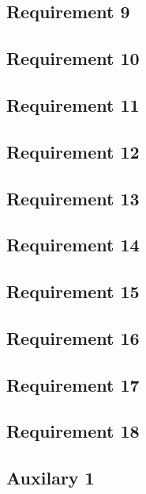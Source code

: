 \documentclass[a4paper]{article}
\begin{document}
    \subsection{Requirement 9}
    

    \subsection{Requirement 10}
    

    \subsection{Requirement 11}
    

    \subsection{Requirement 12}
    

    \subsection{Requirement 13}
    

    \subsection{Requirement 14}
    

    \subsection{Requirement 15}
    

    \subsection{Requirement 16}
    

    \subsection{Requirement 17}
    

    \subsection{Requirement 18}
    
    
    \subsection{Auxilary 1}\label{sec:aux1}
    
\end{document}
